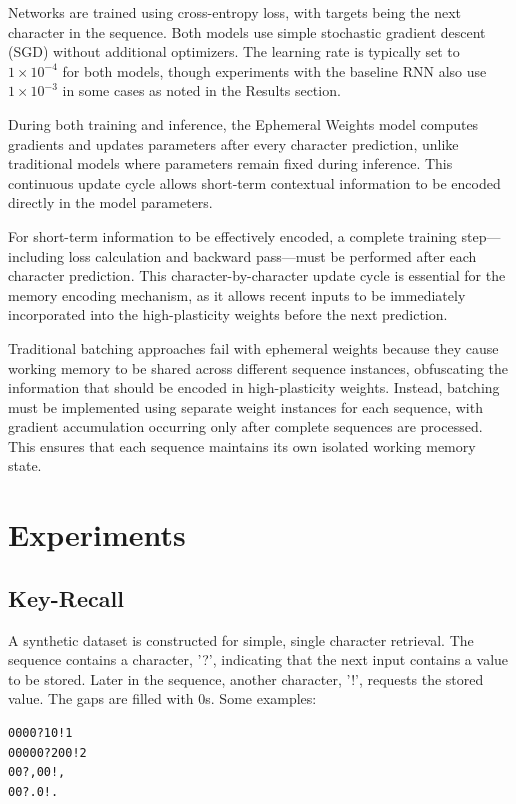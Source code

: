 \documentclass[conference]{IEEEtran}
\begin{document}
Networks are trained using cross-entropy loss, with targets being the next character in the sequence. Both models use simple stochastic gradient descent (SGD) without additional optimizers. The learning rate is typically set to $1 \times 10^{-4}$ for both models, though experiments with the baseline RNN also use $1 \times 10^{-3}$ in some cases as noted in the Results section.

During both training and inference, the Ephemeral Weights model computes gradients and updates parameters after every character prediction, unlike traditional models where parameters remain fixed during inference. This continuous update cycle allows short-term contextual information to be encoded directly in the model parameters.

For short-term information to be effectively encoded, a complete training step—including loss calculation and backward pass—must be performed after each character prediction. This character-by-character update cycle is essential for the memory encoding mechanism, as it allows recent inputs to be immediately incorporated into the high-plasticity weights before the next prediction.

Traditional batching approaches fail with ephemeral weights because they cause working memory to be shared across different sequence instances, obfuscating the information that should be encoded in high-plasticity weights. Instead, batching must be implemented using separate weight instances for each sequence, with gradient accumulation occurring only after complete sequences are processed. This ensures that each sequence maintains its own isolated working memory state.

\section{Experiments}

\subsection{Key-Recall}
A synthetic dataset is constructed for simple, single character retrieval. The sequence contains a character, '?', indicating that the next input contains a value to be stored. Later in the sequence, another character, '!', requests the stored value. The gaps are filled with 0s. Some examples:
\begin{verbatim}
0000?10!1
00000?200!2
00?,00!,
00?.0!.
\end{verbatim}
\end{document}
